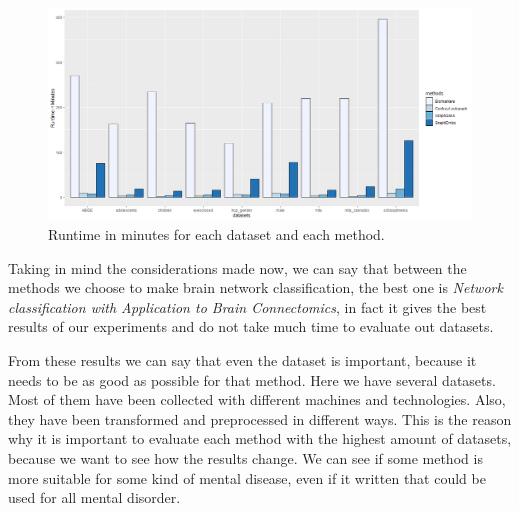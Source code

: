 \begin{figure}[htbp]
	\centering
	\includegraphics[scale=0.3]{Immagini/runtimes_w.png}
	\caption{Runtime in minutes for each dataset and each method.}
	\label{fig:diagram21}
\end{figure}

Taking in mind the considerations made now, we can say that between the methods we choose to make brain network classification, the best one is \textit{Network classification with Application to Brain Connectomics}, in fact it gives the best results of our experiments and do not take much time to evaluate out datasets.

From these results we can say that even the dataset is important, because it needs to be as good as possible for that method. Here we have several datasets. Most of them have been collected with different machines and technologies. Also, they have been transformed and preprocessed in different ways. This is the reason why it is important to evaluate each method with the highest amount of datasets, because we want to see how the results change. We can see if some method is more suitable for some kind of mental disease, even if it written that could be used for all mental disorder.
